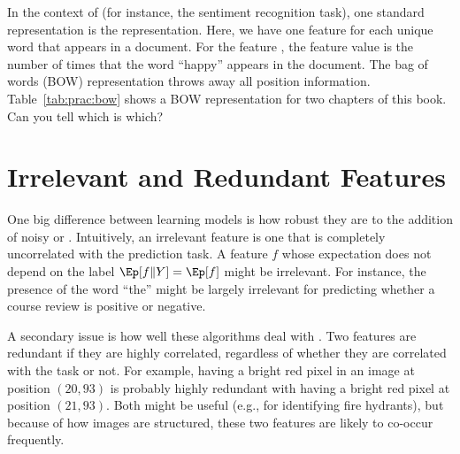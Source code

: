 



In the context of  (for instance, the
sentiment recognition task), one standard representation is the
 representation.  Here, we have one feature for
each unique word that appears in a document.  For the feature
, the feature value is the number of times that the word
``happy'' appears in the document.  The bag of words (BOW)
representation throws away all position information.
Table~\ref{tab:prac:bow} shows a BOW representation for two chapters of this book.
Can you tell which is
which?

\section{Irrelevant and Redundant Features}

One big difference between learning models is how robust they are to
the addition of noisy or .  Intuitively, an
irrelevant feature is one that is completely uncorrelated with the
prediction task.  A feature $f$ whose expectation does not depend on
the label $\Ep[f \| Y] = \Ep[f]$ might be irrelevant.  For instance,
the presence of the word ``the'' might be largely irrelevant for
predicting whether a course review is positive or negative.

A secondary issue is how well these algorithms deal with
.  Two features are redundant if they are
highly correlated, regardless of whether they are correlated with the
task or not.  For example, having a bright red pixel in an image at
position $(20,93)$ is probably highly redundant with having a bright
red pixel at position $(21,93)$.  Both might be useful (e.g., for
identifying fire hydrants), but because of how images are structured,
these two features are likely to co-occur frequently.

